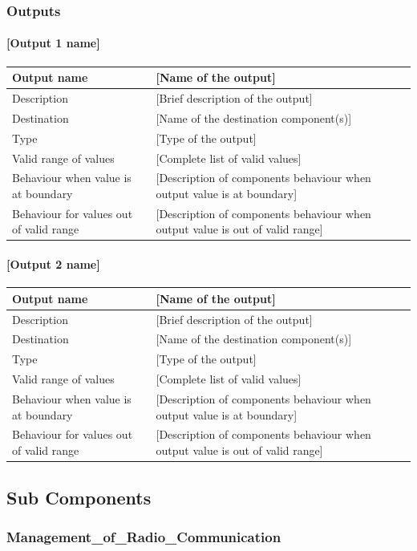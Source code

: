 \subsubsection{Outputs}\label{s:manage_radio_communication_outputs}

\paragraph{[Output 1 name]}

\begin{longtable}{p{}p{}}
\toprule
Output name				& [Name of the output] \\
\midrule
Description				& [Brief description of the output] \\
\midrule
Destination				& [Name of the destination component(s)] \\ 
\midrule
Type					& [Type of the output] \\
\midrule
Valid range of values	& [Complete list of valid values] \\
\midrule
Behaviour when value is at boundary	& [Description of components behaviour when output value is at boundary] \\
\midrule
Behaviour for values out of valid range	& [Description of components behaviour when output value is out of valid range] \\
\bottomrule
\end{longtable}


\paragraph{[Output 2 name]}

\begin{longtable}{p{}p{}}
\toprule
Output name				& [Name of the output] \\
\midrule
Description				& [Brief description of the output] \\
\midrule
Destination				& [Name of the destination component(s)] \\ 
\midrule
Type					& [Type of the output] \\
\midrule
Valid range of values	& [Complete list of valid values] \\
\midrule
Behaviour when value is at boundary	& [Description of components behaviour when output value is at boundary] \\
\midrule
Behaviour for values out of valid range	& [Description of components behaviour when output value is out of valid range] \\
\bottomrule
\end{longtable}


\subsection{Sub Components}

\subsubsection{Management\_of\_Radio\_Communication}



